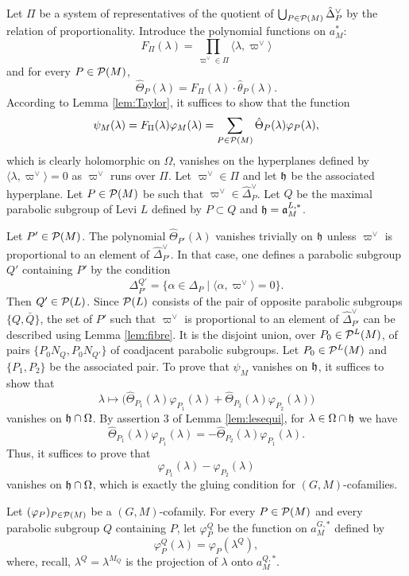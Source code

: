 \begin{paragr}
\begin{preuve}
Let $\Pi$ be a system of representatives of the quotient of $\bigcup_{P\in \mathcal{P}(M)} \hat{\Delta}_P^\vee$ by the relation of proportionality. Introduce the polynomial functions on $a_M^*$:
$$F_\Pi(\lambda)=\prod_{\varpi^\vee \in \Pi} \langle \lambda,\varpi^\vee\rangle$$
and for every $P\in \mathcal{P}(M)$,
$$\hat{\Theta}_{P}(\lambda)=F_\Pi(\lambda) \cdot \hat{\theta}_{P}(\lambda).$$
According to Lemma \ref{lem:Taylor}, it suffices to show that the function
$$\psi_M(\lambda)=F_\Pi(\lambda) \varphi_M(\lambda)=\sum_{P\in \mathcal{P}(M)} \hat{\Theta}_{P}(\lambda) \varphi_P(\lambda),$$
which is clearly holomorphic on $\Omega$, vanishes on the hyperplanes defined by $\langle \lambda,\varpi^\vee\rangle=0$ as $\varpi^\vee$ runs over $\Pi$. Let $\varpi^\vee\in \Pi$ and let $\mathfrak{h}$ be the associated hyperplane. Let $P\in \mathcal{P}(M)$ be such that $\varpi^\vee\in  \hat{\Delta}_P^\vee$. Let $Q$ be the maximal parabolic subgroup of Levi $L$ defined by $P\subset Q$ and $\mathfrak{h}=\mathfrak{a}^{L,*}_M$.

Let $P'\in \mathcal{P}(M)$. The polynomial $\hat{\Theta}_{P'}(\lambda)$ vanishes trivially on $\mathfrak{h}$ unless $\varpi^\vee$ is proportional to an element of $\hat{\Delta}_{P'}^\vee$. In that case, one defines a parabolic subgroup $Q'$ containing $P'$ by the condition
$$\Delta_{P'}^{Q'}=\{\alpha\in \Delta_P \mid \langle \alpha,\varpi^\vee\rangle=0\}.$$
Then $Q'\in \mathcal{P}(L)$. Since $\mathcal{P}(L)$ consists of the pair of opposite parabolic subgroups $\{Q,\bar{Q}\}$, the set of $P'$ such that $\varpi^\vee$ is proportional to an element of $\hat{\Delta}_{P'}^\vee$ can be described using Lemma \ref{lem:fibre}. It is the disjoint union, over $P_0\in \mathcal{P}^L(M)$, of pairs $\{P_0N_Q, P_0N_{Q'}\}$ of coadjacent parabolic subgroups. Let $P_0\in \mathcal{P}^L(M)$ and $\{P_1,P_2\}$ be the associated pair. To prove that $\psi_M$ vanishes on $\mathfrak{h}$, it suffices to show that 
$$\lambda \mapsto \big(\hat{\Theta}_{P_1}(\lambda) \varphi_{P_1}(\lambda)+\hat{\Theta}_{P_2}(\lambda) \varphi_{P_2}(\lambda)\big)$$ 
vanishes on $\mathfrak{h}\cap \Omega$. By assertion 3 of Lemma \ref{lem:lesequi}, for $\lambda\in \Omega\cap \mathfrak{h}$ we have
$$\hat{\Theta}_{P_1}(\lambda) \varphi_{P_1}(\lambda)=-\hat{\Theta}_{P_2}(\lambda) \varphi_{P_1}(\lambda).$$
Thus, it suffices to prove that 
$$\varphi_{P_1}(\lambda)-\varphi_{P_2}(\lambda)$$
vanishes on $\mathfrak{h}\cap \Omega$, which is exactly the gluing condition for $(G,M)$-cofamilies.
\end{preuve}
\end{paragr}

Let $(\varphi_P)_{P\in \mathcal{P}(M)}$ be a $(G,M)$-cofamily. For every $P\in \mathcal{P}(M)$ and every parabolic subgroup $Q$ containing $P$, let $\varphi_P^Q$ be the function on $a_M^{G,*}$ defined by
$$\varphi_P^Q(\lambda)=\varphi_P(\lambda^Q),$$
where, recall, $\lambda^Q=\lambda^{M_Q}$ is the projection of $\lambda$ onto $a_M^{Q,*}$.

